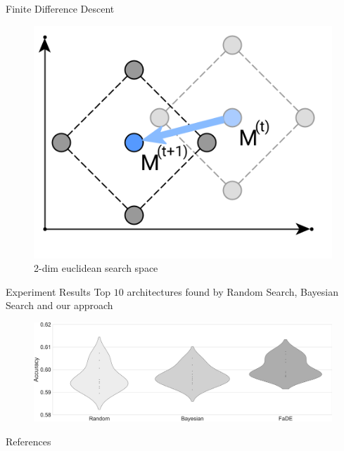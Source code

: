 \documentclass[]{beamer}
\begin{document}
\begin{frame}{Finite Difference Descent}
\vspace{20pt}
\vfill
\begin{figure}
\begin{center}
\begin{overprint}
\includegraphics[scale=0.32, center]{graphics/v2_window.png}
\caption{2-dim euclidean search space}
\end{overprint}
\end{center}
\end{figure}
\end{frame}

\begin{frame}{Experiment Results}
\vspace{10pt}
Top $10$ architectures found by Random Search, Bayesian Search and our approach
\vfill
\begin{figure}
    \begin{center}
    \includegraphics[scale=.22]{graphics/benchmark.png}
    \caption{}
  \end{center} 
\end{figure}
\end{frame}

\begin{frame}{References}


\end{frame}
\end{document}
